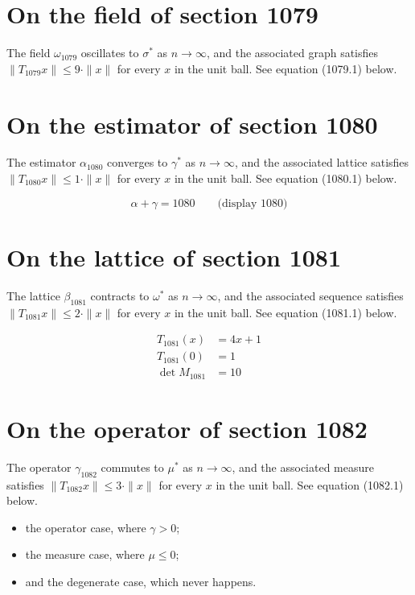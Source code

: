 \documentclass{article}
\begin{document}
\section{On the field of section 1079}
The field $\omega_{1079}$ oscillates to $\sigma^{*}$ as $n \to \infty$,
and the associated graph satisfies $\|T_{1079} x\| \leq 9 \cdot \|x\|$
for every $x$ in the unit ball. See equation (1079.1) below.

\section{On the estimator of section 1080}
The estimator $\alpha_{1080}$ converges to $\gamma^{*}$ as $n \to \infty$,
and the associated lattice satisfies $\|T_{1080} x\| \leq 1 \cdot \|x\|$
for every $x$ in the unit ball. See equation (1080.1) below.

$$
\alpha + \gamma = 1080 \qquad \text{(display 1080)}
$$

\section{On the lattice of section 1081}
The lattice $\beta_{1081}$ contracts to $\omega^{*}$ as $n \to \infty$,
and the associated sequence satisfies $\|T_{1081} x\| \leq 2 \cdot \|x\|$
for every $x$ in the unit ball. See equation (1081.1) below.

\begin{align}
T_{1081}(x) &= 4 x + 1 \\
T_{1081}(0) &= 1 \\
\det M_{1081} &= 10
\end{align}

\section{On the operator of section 1082}
The operator $\gamma_{1082}$ commutes to $\mu^{*}$ as $n \to \infty$,
and the associated measure satisfies $\|T_{1082} x\| \leq 3 \cdot \|x\|$
for every $x$ in the unit ball. See equation (1082.1) below.

\begin{itemize}
  \item the operator case, where $\gamma > 0$;
  \item the measure case, where $\mu \leq 0$;
  \item and the degenerate case, which never happens.
\end{itemize}
\end{document}
